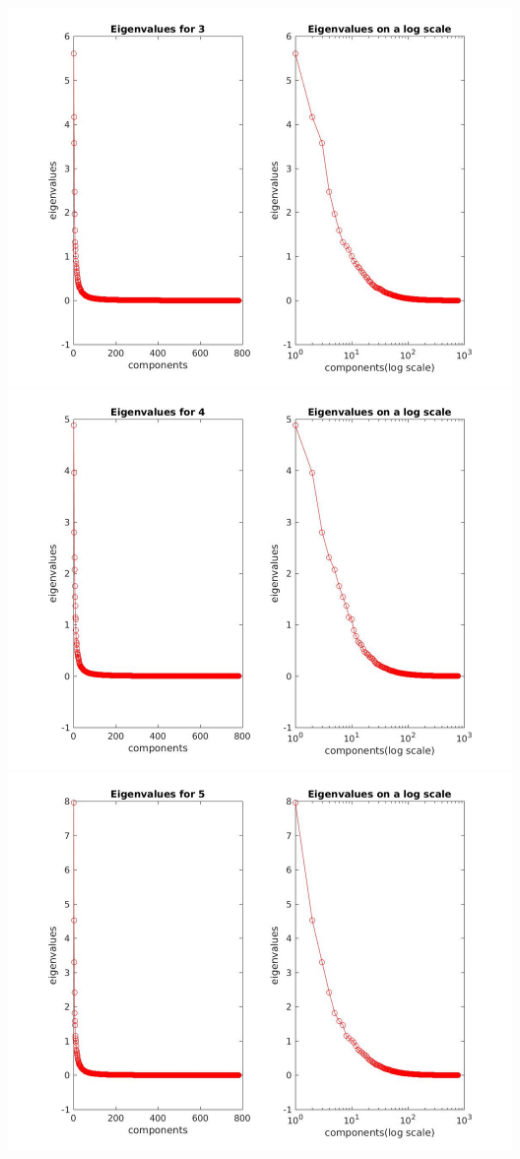 \documentclass[12pt, a4paper]{article}
\begin{document}
\includegraphics[width=\textwidth, height = 0.25\paperheight]{Eigen_3}
\includegraphics[width=\textwidth, height = 0.25\paperheight]{Eigen_4}
\includegraphics[width=\textwidth, height = 0.25\paperheight]{Eigen_5}
\end{document}
